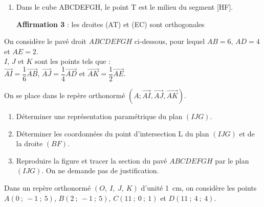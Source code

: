 \begin{colonne*exercice}
\begin{exercice}
\begin{enumerate}
                                      \item Dans le cube ABCDEFGH, le
                                        point T est le milieu du
                                        segment [HF].


                                        \begin{center}
                                          
                                        \end{center}
                                        \textbf{Affirmation 3} : les
                                        droites (AT) et (EC) sont
                                        orthogonales

                                      \end{enumerate}
                                    \end{exercice}

%

\begin{exercice}
  On considère le pavé droit $ABCDEFGH$ ci-dessous, pour lequel
  $AB = 6$, $AD = 4$ et $AE = 2$.\\
  $I$, $J$ et $K$ sont les points tels que :\\
  $\overrightarrow{AI} = \dfrac{1}{6} \overrightarrow{AB}$,
  $ \overrightarrow{AJ} = \dfrac{1}{4} \overrightarrow{AD}$ et
  $ \overrightarrow{AK} = \dfrac{1}{2} \overrightarrow {AE}$.

  \begin{center}
    
  \end{center}

On se place dans le repère orthonormé $(A;\vec{AI},\vec{AJ},\vec{AK})$.
\begin{enumerate}
\item Déterminer une représentation paramétrique du plan $(IJG)$.
\item Déterminer les coordonnées du point d'intersection L du plan
  $(IJG)$ et de la droite $(BF)$.
\item Reproduire la figure et tracer la section du pavé $ABCDEFGH$ par
  le plan $(IJG)$. On ne demande pas de justification.
\end{enumerate}
\end{exercice}

\begin{exercice}
  Dans un repère orthonormé $(O,~I,~J,~K)$ d'unité 1~cm, on considère
  les points $A(0~;~-1~;~5)$, $B(2~;~-1~;~5)$, $C(11~;~0~;~1)$ et
  $D(11~;~4~;~4)$.


\end{exercice}
\end{colonne*exercice}
